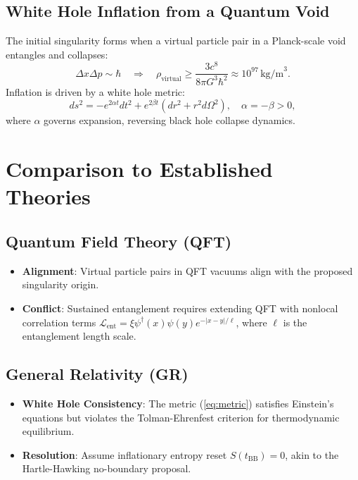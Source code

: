 \documentclass[12pt, a4paper]{article}
\begin{document}
\subsection{White Hole Inflation from a Quantum Void}
The initial singularity forms when a virtual particle pair in a Planck-scale void entangles and collapses:
\begin{equation}
\Delta x \Delta p \sim \hbar \quad \Rightarrow \quad \rho_{\text{virtual}} \geq \frac{3c^8}{8\pi G^3 \hbar^2} \approx 10^{97} \, \text{kg/m}^3. \label{eq:singularity}
\end{equation}
Inflation is driven by a white hole metric:
\begin{equation}
ds^2 = -e^{2\alpha t} dt^2 + e^{2\beta t} \left( dr^2 + r^2 d\Omega^2 \right), \quad \alpha = -\beta > 0, \label{eq:metric}
\end{equation}
where \( \alpha \) governs expansion, reversing black hole collapse dynamics.

\section{Comparison to Established Theories}
\subsection{Quantum Field Theory (QFT)}
\begin{itemize}
\item \textbf{Alignment}: Virtual particle pairs in QFT vacuums align with the proposed singularity origin.
\item \textbf{Conflict}: Sustained entanglement requires extending QFT with nonlocal correlation terms \( \mathscr{L}_{\text{ent}} = \xi \psi^\dagger(x) \psi(y) e^{-|x-y|/\ell} \), where \( \ell \) is the entanglement length scale.
\end{itemize}

\subsection{General Relativity (GR)}
\begin{itemize}
\item \textbf{White Hole Consistency}: The metric (\ref{eq:metric}) satisfies Einstein's equations but violates the Tolman-Ehrenfest criterion for thermodynamic equilibrium.
\item \textbf{Resolution}: Assume inflationary entropy reset \( S(t_{\text{BB}}) = 0 \), akin to the Hartle-Hawking no-boundary proposal.
\end{itemize}
\end{document}
